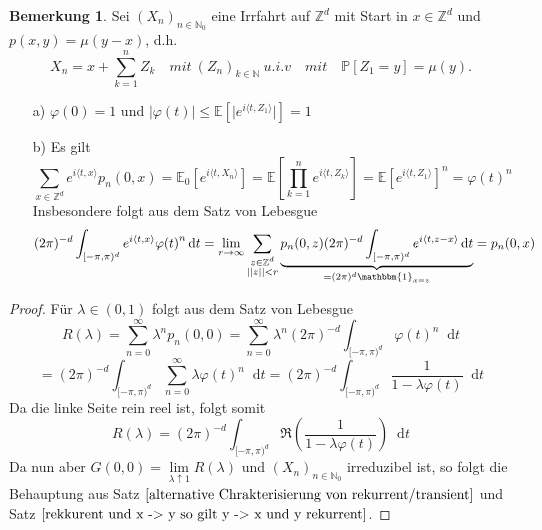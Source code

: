 \documentclass[a4paper,12pt]{scrartcl}
\theoremstyle{definition}
\newtheorem{bem}{Bemerkung}[section]
\newcommand*\diff{\mathop{}\!\mathrm{d}}
\begin{document}
\begin{bem}
Sei $(X_{n})_{n \in \mathbb{N}_{0}}$ eine Irrfahrt auf $\mathbb{Z}^{d}$ mit Start in $x \in \mathbb{Z}^{d}$ und $p(x,y) = \mu(y-x)$, d.h.
\begin{equation*}
X_{n} = x + \sum_{k=1}^{n} Z_{k} \quad mit \: (Z_{n})_{k \in \mathbb{N}} \: u.i.v\quad mit \quad \mathbb{P}[Z_{1} = y] = \mu(y).
\end{equation*}
\begin{itemize}
\item[a)]  $\varphi(0) = 1$ und $\vert \varphi(t) \vert \leq \mathbb{E}[\vert e^{i \langle t, Z_{1} \rangle} \vert] = 1 $
\item[b)] Es gilt
\begin{equation*}
\sum_{x \in \mathbb{Z}^{d}} e^{i \langle t, x \rangle} p_{n}(0,x) = \mathbb{E}_{0}[e^{i \langle t, X_{n} \rangle} ] = \mathbb{E}[\prod_{k=1}^{n} e^{i \langle t, Z_{k} \rangle}] = \mathbb{E}[e^{i \langle t, Z_{1} \rangle}]^{n} = {\varphi (t)}^{n}
\end{equation*}
Insbesondere folgt aus dem Satz von Lebesgue
\begin{equation*}
(2 \pi)^{-d} \int_{[-\pi, \pi)^{d}} e^{i \langle t, x \rangle} {\varphi (t)}^{n} \diff t = \lim_{r \to \infty} \sum_{\substack{{z \in \mathbb{Z}^{d}} \\ {\vert \vert z \vert \vert < r}}} \underbrace{ p_{n}(0,z) (2 \pi)^{-d} \int_{[-\pi, \pi)^{d}} e^{i \langle t, z- x \rangle} \diff t }_{= (2\pi)^{d} \mathbbm{1}_{x=
z}} = p_{n}(0,x)
\end{equation*}
\end{itemize}
\end{bem}
\begin{proof}
Für $\lambda \in (0,1)$ folgt aus dem Satz von Lebesgue
\begin{equation*}
R(\lambda) = \sum_{n=0}^{\infty} \lambda^{n} p_{n}(0,0) = \sum_{n = 0}^{\infty} \lambda^{n} (2 \pi)^{-d}  \int_{[-\pi, \pi)^{d}} {\varphi (t)}^{n} \diff t
\end{equation*}
\begin{equation*}
= (2\pi)^{-d}  \int_{[-\pi, \pi)^{d}} \sum_{n=0}^{\infty} {\lambda \varphi (t)}^{n} \diff t = (2\pi)^{-d}  \int_{[-\pi, \pi)^{d}} \dfrac{1}{1 - \lambda \varphi(t)} \diff t
\end{equation*}
Da die linke Seite rein reel ist, folgt somit
\begin{equation*}
R(\lambda) = (2\pi)^{-d}  \int_{[-\pi, \pi)^{d}} \mathfrak{R}({\dfrac{1}{1 - \lambda \varphi(t)}}) \diff t
\end{equation*}
Da nun aber $G(0,0) = \lim \limits_{\lambda \uparrow 1} R(\lambda)$ und $(X_{n})_{n \in \mathbb{N}_{0}}$ irreduzibel ist, so folgt die Behauptung aus Satz $\ref{alternative Chrakterisierung von rekurrent/transient}$ und Satz $\ref{rekkurent und x -> y so gilt y -> x und y rekurrent}$.
\end{proof}
\end{document}
